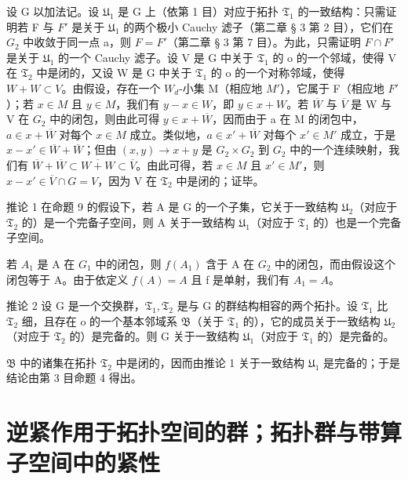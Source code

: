 设 G 以加法记。设 \(\mathfrak{U}_{1}\) 是 G 上（依第 1 目）对应于拓扑 \(\mathfrak{T}_{1}\) 的一致结构：只需证明若 F 与 \(F'\) 是关于 \(\mathfrak{U}_{1}\) 的两个极小 Cauchy 滤子（第二章 § 3 第 2 目），它们在 \(G_{2}\) 中收敛于同一点 a，则 \(F = F'\)（第二章 § 3 第 7 目）。为此，只需证明 \(F \cap F'\) 是关于 \(\mathfrak{U}_{1}\) 的一个 Cauchy 滤子。设 V 是 G 中关于 \(\mathfrak{T}_{1}\) 的 o 的一个邻域，使得 V 在 \(\mathfrak{T}_{2}\) 中是闭的，又设 W 是 G 中关于 \(\mathfrak{T}_{1}\) 的 o 的一个对称邻域，使得 \(W + W \subset V\)。由假设，存在一个 \(W_{d}\)-小集 M（相应地 \(M'\)），它属于 F（相应地 \(F'\)）；若 \(x \in M\) 且 \(y \in M\)，我们有 \(y - x \in W\)，即 \(y \in x + W\)。若 \(\overline{W}\) 与 \(\overline{V}\) 是 W 与 V 在 \(G_{2}\) 中的闭包，则由此可得 \(y \in x + \overline{W}\)，因而由于 a 在 M 的闭包中，\(a \in x + \overline{W}\) 对每个 \(x \in M\) 成立。类似地，\(a \in x' + \overline{W}\) 对每个 \(x' \in M'\) 成立，于是 \(x - x' \in \overline{W} + \overline{W}\)；但由 \((x, y) \to x + y\) 是 \(G_{2} \times G_{2}\) 到 \(G_{2}\) 中的一个连续映射，我们有 \(\overline{W} + \overline{W} \subset \overline{W + W} \subset \overline{V}\)。由此可得，若 \(x \in M\) 且 \(x' \in M'\)，则 \(x - x' \in \overline{V} \cap G = V\)，因为 V 在 \(\mathfrak{T}_{2}\) 中是闭的；证毕。

推论 1 在命题 9 的假设下，若 A 是 G 的一个子集，它关于一致结构 \(\mathfrak{U}_{2}\)（对应于 \(\mathfrak{T}_{2}\) 的）是一个完备子空间，则 A 关于一致结构 \(\mathfrak{U}_{1}\)（对应于 \(\mathfrak{T}_{1}\) 的）也是一个完备子空间。

若 \(A_{1}\) 是 A 在 \(G_{1}\) 中的闭包，则 \(f(A_{1})\) 含于 A 在 \(G_{2}\) 中的闭包，而由假设这个闭包等于 A。由于依定义 \(f(A)=A\) 且 f 是单射，我们有 \(A_{1}=A\)。

推论 2 设 G 是一个交换群，\(\mathfrak{T}_1, \mathfrak{T}_2\) 是与 G 的群结构相容的两个拓扑。设 \(\mathfrak{T}_1\) 比 \(\mathfrak{T}_2\) 细，且存在 o 的一个基本邻域系 \(\mathfrak{B}\)（关于 \(\mathfrak{T}_1\) 的），它的成员关于一致结构 \(\mathfrak{U}_2\)（对应于 \(\mathfrak{T}_2\) 的）是完备的。则 G 关于一致结构 \(\mathfrak{U}_1\)（对应于 \(\mathfrak{T}_1\) 的）是完备的。

\(\mathfrak{B}\) 中的诸集在拓扑 \(\mathfrak{T}_{2}\) 中是闭的，因而由推论 1 关于一致结构 \(\mathfrak{U}_{1}\) 是完备的；于是结论由第 3 目命题 4 得出。

\section{逆紧作用于拓扑空间的群；拓扑群与带算子空间中的紧性}

